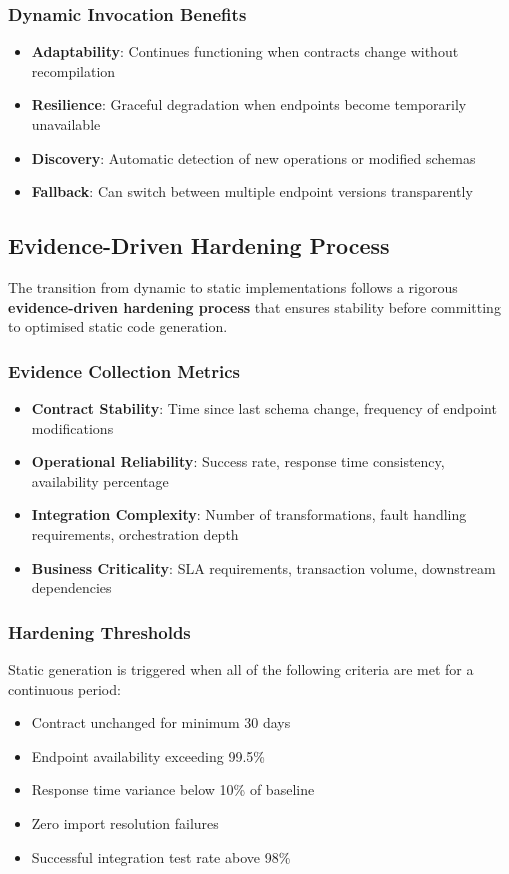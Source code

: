 \documentclass[11pt,a4paper]{article}
\begin{document}
\subsubsection{Dynamic Invocation Benefits}
\begin{itemize}
\item \textbf{Adaptability}: Continues functioning when contracts change without recompilation
\item \textbf{Resilience}: Graceful degradation when endpoints become temporarily unavailable
\item \textbf{Discovery}: Automatic detection of new operations or modified schemas
\item \textbf{Fallback}: Can switch between multiple endpoint versions transparently
\end{itemize}

\subsection{Evidence-Driven Hardening Process}
The transition from dynamic to static implementations follows a rigorous \textbf{evidence-driven hardening process} that ensures stability before committing to optimised static code generation.

\subsubsection{Evidence Collection Metrics}
\begin{itemize}
\item \textbf{Contract Stability}: Time since last schema change, frequency of endpoint modifications
\item \textbf{Operational Reliability}: Success rate, response time consistency, availability percentage
\item \textbf{Integration Complexity}: Number of transformations, fault handling requirements, orchestration depth
\item \textbf{Business Criticality}: SLA requirements, transaction volume, downstream dependencies
\end{itemize}

\subsubsection{Hardening Thresholds}
Static generation is triggered when all of the following criteria are met for a continuous period:
\begin{itemize}
\item Contract unchanged for minimum 30 days
\item Endpoint availability exceeding 99.5\%
\item Response time variance below 10\% of baseline
\item Zero import resolution failures
\item Successful integration test rate above 98\%
\end{itemize}
\end{document}
